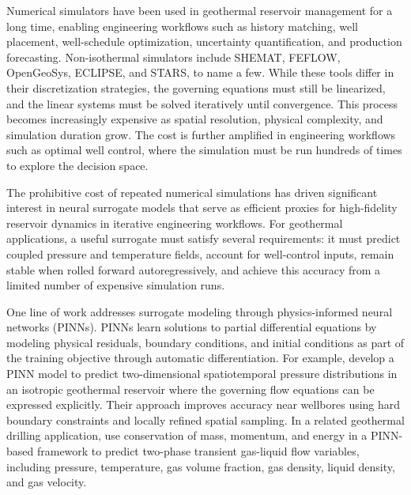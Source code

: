 \documentclass[pdflatex,sn-mathphys-ay]{sn-jnl}
\begin{document}
Numerical simulators have been used in geothermal reservoir management for a long
time, enabling engineering workflows such as history matching, well placement,
well-schedule optimization, uncertainty quantification, and production
forecasting. Non-isothermal simulators include SHEMAT, FEFLOW, OpenGeoSys,
ECLIPSE, and STARS, to name a few. While these tools differ in their
discretization strategies, the governing equations must still be linearized, and
the linear systems must be solved iteratively until convergence. This process
becomes increasingly expensive as spatial resolution, physical complexity, and
simulation duration grow. The cost is further amplified in engineering workflows
such as optimal well control, where the simulation must be run hundreds of times
to explore the decision space.

The prohibitive cost of repeated numerical simulations has driven significant interest 
in neural surrogate models that serve as efficient proxies for high-fidelity reservoir dynamics in iterative engineering workflows.
For geothermal applications,
a useful surrogate must satisfy several requirements: it must predict coupled
pressure and temperature fields, account for well-control
inputs, remain stable when rolled forward autoregressively, and achieve this
accuracy from a limited number of expensive simulation runs.


One line of work addresses surrogate modeling through physics-informed neural
networks (PINNs). PINNs learn solutions to partial differential
equations by modeling physical residuals, boundary conditions, and initial 
conditions as part of the training objective through automatic
differentiation. For example,
\cite{zhaoSurrogateModelingGeothermal2025} develop a PINN model to predict
two-dimensional spatiotemporal pressure distributions in an isotropic geothermal
reservoir where the governing flow equations can be expressed explicitly. Their
approach improves accuracy near wellbores using hard boundary constraints and
locally refined spatial sampling. In a related geothermal drilling application,
\cite{yuanPredictionModelPressure2024} use conservation of mass, momentum, and
energy in a PINN-based framework to predict two-phase transient gas-liquid flow
variables, including pressure, temperature, gas volume fraction, gas density,
liquid density, and gas velocity.
\end{document}
